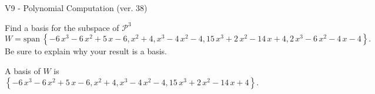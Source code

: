 \begin{exercise}
  \begin{exerciseTitle}V9 - Polynomial Computation (ver. 38)\end{exerciseTitle}
  \begin{exerciseStatement}
    Find a basis for the subspace of \(\mathcal{P}^3\) 
\[W=\mathrm{span}\ \left\{-6 \, x^{3} - 6 \, x^{2} + 5 \, x - 6 , x^{2} + 4 , x^{3} - 4 \, x^{2} - 4 , 15 \, x^{3} + 2 \, x^{2} - 14 \, x + 4 , 2 \, x^{3} - 6 \, x^{2} - 4 \, x - 4\right\}.\]
 Be sure to explain why your result is a basis.


  \end{exerciseStatement}
  \begin{exerciseAnswer}
   A basis of \(W\) is  \(\left\{-6 \, x^{3} - 6 \, x^{2} + 5 \, x - 6 , x^{2} + 4 , x^{3} - 4 \, x^{2} - 4 , 15 \, x^{3} + 2 \, x^{2} - 14 \, x + 4\right\}\).
  


  \end{exerciseAnswer}
\end{exercise}